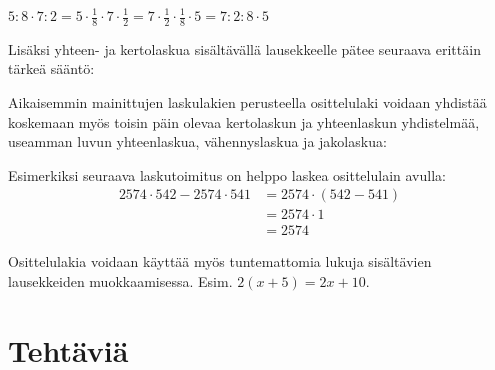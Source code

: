 \begin{esimerkki}
$5:8\cdot 7:2=5\cdot\frac18\cdot 7\cdot\frac12=7\cdot \frac12\cdot\frac18\cdot 5=7:2:8\cdot 5$
\end{esimerkki} 

Lisäksi yhteen- ja kertolaskua sisältävällä lausekkeelle pätee seuraava erittäin tärkeä sääntö:


Aikaisemmin mainittujen laskulakien perusteella osittelulaki voidaan yhdistää koskemaan myös toisin päin olevaa kertolaskun ja yhteenlaskun yhdistelmää, useamman luvun yhteenlaskua, vähennyslaskua ja jakolaskua:


Esimerkiksi seuraava laskutoimitus on helppo laskea osittelulain avulla: 
     \begin{align*}
	  2574\cdot 542-2574\cdot 541 &= 2574\cdot (542-541)  \\ &= 2574\cdot 1 \\ &= 2574
     \end{align*}


Osittelulakia voidaan käyttää myös tuntemattomia lukuja sisältävien lausekkeiden muokkaamisessa. Esim. $2(x+5)=2x+10$.
    

\section*{Tehtäviä}
   
